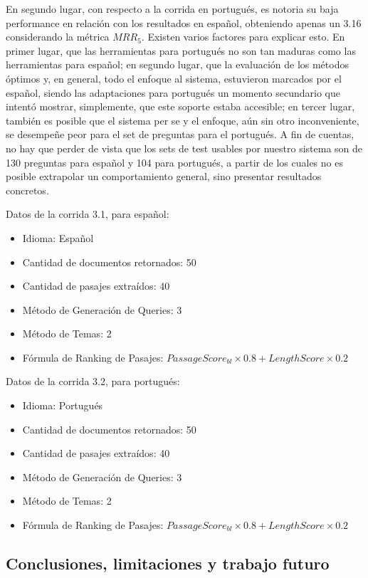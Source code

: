 En segundo lugar, con respecto a la corrida en portugués, es notoria su baja performance en relación con los resultados en español, obteniendo apenas un 3.16 considerando la métrica $MRR_5$. Existen varios factores para explicar esto. En primer lugar, que las herramientas para portugués no son tan maduras como las herramientas para español; en segundo lugar, que la evaluación de los métodos óptimos y, en general, todo el enfoque al sistema, estuvieron marcados por el español, siendo las adaptaciones para portugués un momento secundario que intentó mostrar, simplemente, que este soporte estaba accesible; en tercer lugar, también es posible que el sistema per se y el enfoque, aún sin otro inconveniente, se desempeñe peor para el set de preguntas para el portugués. A fin de cuentas, no hay que perder de vista que los sets de test usables por nuestro sistema son de 130 preguntas para español y 104 para portugués, a partir de los cuales no es posible extrapolar un comportamiento general, sino presentar resultados concretos.

\medskip

Datos de la corrida 3.1, para español:
\begin{itemize}
  \item Idioma: Español
  \item Cantidad de documentos retornados: 50
  \item Cantidad de pasajes extraídos: 40
  \item Método de Generación de Queries: 3
  \item Método de Temas: 2
  \item Fórmula de Ranking de Pasajes:  $PassageScore_{bl} \times 0.8 + LengthScore \times 0.2$
\end{itemize}
\medskip
Datos de la corrida 3.2, para portugués:
\begin{itemize}
  \item Idioma: Portugués
  \item Cantidad de documentos retornados: 50
  \item Cantidad de pasajes extraídos: 40
  \item Método de Generación de Queries: 3
  \item Método de Temas: 2
  \item Fórmula de Ranking de Pasajes:  $PassageScore_{bl} \times 0.8 + LengthScore \times 0.2$
\end{itemize}

\subsection{Conclusiones, limitaciones y trabajo futuro}
\label{sec:clef-cierre}

